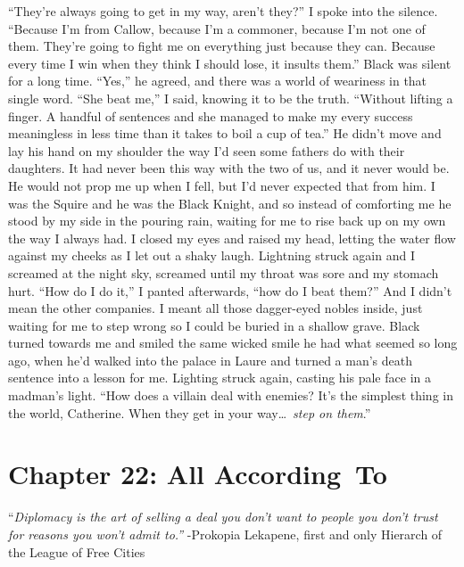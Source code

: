 \documentclass[12pt, openany]{book}
\begin{document}
“They’re always going to get in my way, aren’t they?” I spoke into the silence. “Because I’m from Callow, because I’m a commoner, because I’m not one of them. They’re going to fight me on everything just because they can. Because every time I win when they think I should lose, it insults them.”
Black was silent for a long time.
“Yes,” he agreed, and there was a world of weariness in that single word.
“She beat me,” I said, knowing it to be the truth. “Without lifting a finger. A handful of sentences and she managed to make my every success meaningless in less time than it takes to boil a cup of tea.”
He didn’t move and lay his hand on my shoulder the way I’d seen some fathers do with their daughters. It had never been this way with the two of us, and it never would be. He would not prop me up when I fell, but I’d never expected that from him. I was the Squire and he was the Black Knight, and so instead of comforting me he stood by my side in the pouring rain, waiting for me to rise back up on my own the way I always had. I closed my eyes and raised my head, letting the water flow against my cheeks as I let out a shaky laugh. Lightning struck again and I screamed at the night sky, screamed until my throat was sore and my stomach hurt.
“How do I do it,” I panted afterwards, “how do I beat them?”
And I didn’t mean the other companies. I meant all those dagger-eyed nobles inside, just waiting for me to step wrong so I could be buried in a shallow grave. Black turned towards me and smiled the same wicked smile he had what seemed so long ago, when he’d walked into the palace in Laure and turned a man’s death sentence into a lesson for me. Lighting struck again, casting his pale face in a madman’s light.
“How does a villain deal with enemies? It’s the simplest thing in the world, Catherine. When they get in your way… \textit{step on them}.”
\clearpage
\chapter{Chapter 22: All According To}

“\textit{Diplomacy is the art of selling a deal you don’t want to people you don’t trust for reasons you won’t admit to.”}
-Prokopia Lekapene, first and only Hierarch of the League of Free Cities
\end{document}
